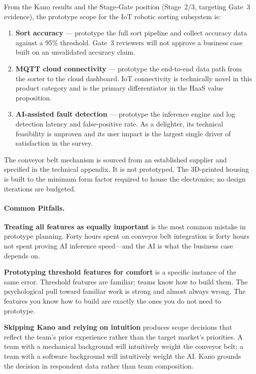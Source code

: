 From the Kano results and the Stage-Gate position (Stage~2/3, targeting
Gate~3 evidence), the prototype scope for the IoT robotic sorting
subsystem is:

\begin{enumerate}
  \item \textbf{Sort accuracy} --- prototype the full sort pipeline and
        collect accuracy data against a 95\% threshold.
        Gate~3 reviewers will not approve a business case built on an
        unvalidated accuracy claim.
  \item \textbf{MQTT cloud connectivity} --- prototype the end-to-end
        data path from the sorter to the cloud dashboard.
        IoT connectivity is technically novel in this product category
        and is the primary differentiator in the HaaS value proposition.
  \item \textbf{AI-assisted fault detection} --- prototype the inference
        engine and log detection latency and false-positive rate.
        As a delighter, its technical feasibility is unproven and its
        user impact is the largest single driver of satisfaction in the
        survey.
\end{enumerate}

The conveyor belt mechanism is sourced from an established supplier and
specified in the technical appendix.
It is not prototyped.
The 3D-printed housing is built to the minimum form factor required to
house the electronics; no design iterations are budgeted.

\paragraph{Common Pitfalls.}
\textbf{Treating all features as equally important} is the most common
mistake in prototype planning.
Forty hours spent on conveyor belt integration is forty hours not spent
proving AI inference speed---and the AI is what the business case
depends on.

\textbf{Prototyping threshold features for comfort} is a specific
instance of the same error.
Threshold features are familiar; teams know how to build them.
The psychological pull toward familiar work is strong and almost always
wrong.
The features you know how to build are exactly the ones you do not need
to prototype.

\textbf{Skipping Kano and relying on intuition} produces scope decisions
that reflect the team's prior experience rather than the target market's
priorities.
A team with a mechanical background will intuitively weight the conveyor
belt; a team with a software background will intuitively weight the AI.
Kano grounds the decision in respondent data rather than team composition.

